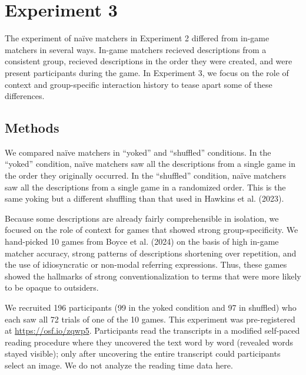 \documentclass[10pt, letterpaper]{article}
\begin{document}
\section{Experiment 3}\label{experiment-3}

The experiment of naïve matchers in Experiment 2 differed from in-game
matchers in several ways. In-game matchers recieved descriptions from a
consistent group, recieved descriptions in the order they were created,
and were present participants during the game. In Experiment 3, we focus
on the role of context and group-specific interaction history to tease
apart some of these differences.

\subsection{Methods}\label{methods-2}

We compared naïve matchers in ``yoked'' and ``shuffled'' conditions. In
the ``yoked'' condition, naïve matchers saw all the descriptions from a
single game in the order they originally occurred. In the ``shuffled''
condition, naïve matchers saw all the descriptions from a single game in
a randomized order. This is the same yoking but a different shuffling
than that used in Hawkins et al. (2023).

Because some descriptions are already fairly comprehensible in
isolation, we focused on the role of context for games that showed
strong group-specificity. We hand-picked 10 games from Boyce et al.
(2024) on the basis of high in-game matcher accuracy, strong patterns of
descriptions shortening over repetition, and the use of idiosyncratic or
non-modal referring expressions. Thus, these games showed the hallmarks
of strong conventionalization to terms that were more likely to be
opaque to outsiders.

We recruited 196 participants (99 in the yoked condition and 97 in
shuffled) who each saw all 72 trials of one of the 10 games. This
experiment was pre-registered at \url{https://osf.io/zqwp5}.
Participants read the transcripts in a modified self-paced reading
procedure where they uncovered the text word by word (revealed words
stayed visible); only after uncovering the entire transcript could
participants select an image. We do not analyze the reading time data
here.
\end{document}
